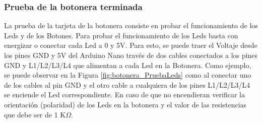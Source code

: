 \documentclass{article}
\begin{document}
\subsubsection{Prueba de la botonera terminada}
La prueba de la tarjeta de la botonera consiste en probar el funcionamiento de los Leds y de los Botones. Para probar el funcionamiento de los Leds basta con energizar o conectar cada Led a 0 y 5V. Para esto, se puede traer el Voltaje desde los pines GND y 5V del Arduino Nano través de dos cables conectados a los pines GND y L1/L2/L3/L4 que alimentan a cada Led en la Botonera. Como ejemplo, se puede observar en la Figura \ref{fig:botonera_PruebaLeds} como al conectar uno de los cables al pin GND y el otro cable a cualquiera de los pines L1/L2/L3/L4 se enciende el Led correspondiente. En caso de que no encendieran verificar la orientación (polaridad) de los Leds en la botonera y el valor de las resistencias que debe ser de 1 K$\Omega$.
\end{document}
